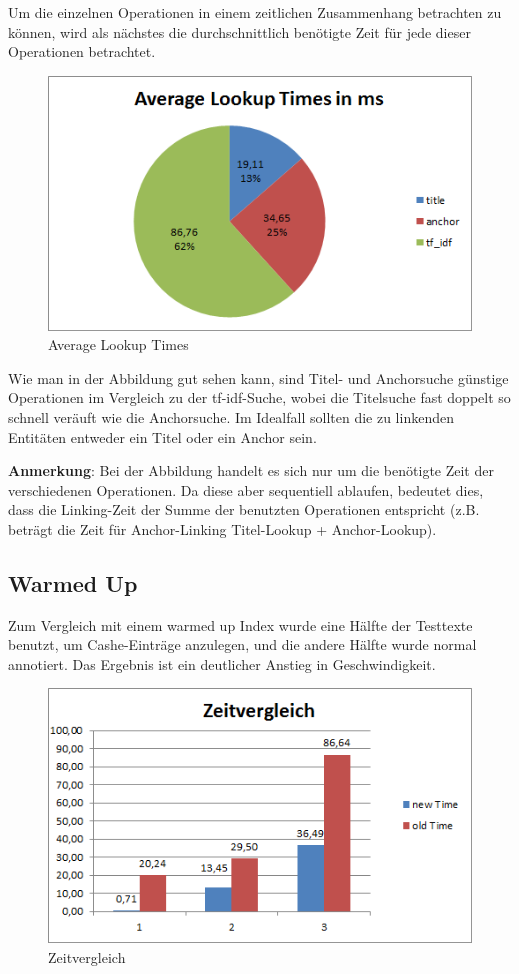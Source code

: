 \documentclass[11pt, a4paper, oneside]{Thesis} %
\begin{document}
Um die einzelnen Operationen in einem zeitlichen Zusammenhang betrachten zu k\"onnen, wird als n\"achstes die durchschnittlich ben\"otigte Zeit f\"ur jede dieser Operationen betrachtet. 
\begin{figure}[ht!]
\centering
\includegraphics[scale=1]{./lookupTime.png}
\caption[Average Lookup Times]{Average Lookup Times}
\end{figure}

Wie man in der Abbildung gut sehen kann, sind Titel- und Anchorsuche g\"unstige Operationen im Vergleich zu der tf-idf-Suche, wobei die Titelsuche fast doppelt so schnell ver\"auft wie die Anchorsuche. Im Idealfall sollten die zu linkenden Entit\"aten entweder ein Titel oder ein Anchor sein.

\textbf{Anmerkung}: Bei der Abbildung handelt es sich nur um die ben\"otigte Zeit der verschiedenen Operationen. Da diese aber sequentiell ablaufen, bedeutet dies, dass die Linking-Zeit der Summe der benutzten Operationen entspricht (z.B. betr\"agt die Zeit f\"ur Anchor-Linking Titel-Lookup + Anchor-Lookup).
\subsection{Warmed Up}
Zum Vergleich mit einem \grqq warmed up Index \grqq{} wurde eine H\"alfte der Testtexte benutzt, um Cashe-Eintr\"age anzulegen, und die andere H\"alfte wurde  normal annotiert. Das Ergebnis ist ein deutlicher Anstieg in Geschwindigkeit.
\begin{figure}[ht!]
\centering
\includegraphics[scale=1]{./zeitvergleich.png}
\caption[Zeitvergleich warmed vs unarmed]{Zeitvergleich}
\end{figure}
\end{document}
